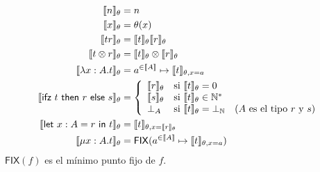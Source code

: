 \documentclass[twoside,a4paper,12pt]{article}
\theoremstyle{definition}
\theoremstyle{remark}
\begin{document}
\begin{align*}
  \semT{n}             &= n \\
  \semT{x}             &= \theta(x) \\
  \semT{tr}            &= \semT{t} \semT{r} \\
  \semT{t\otimes r}    &= \semT{t} \otimes \semT{r} \\
  \semT{\fun{x:A}t}    &= \funSem{a}{A}{\semT[\theta,x=a]{t}} \\
  \semT{\ifz trs}      &=
    \left\{\begin{array}{ll}
      \semT{r} & \textrm{si }\semT{t} = 0 \\
      \semT{s} & \textrm{si }\semT{t} \in \mathbb{N^*} \\
      \bot_{A} & \textrm{si }\semT{t} = \bot_{\mathbb N} \quad \textrm{($A$ es el tipo $r$ y $s$)}
    \end{array}\right. \\
  \semT{\letl{x:A}{r}{t}} &= \semT[\theta,x=\semT{r}]{t} \\
  \semT{\fix{x:A}{t}}     &= \FIX(\funSem{a}{A}{\semT[\theta,x=a]{t}})
\end{align*}
$\mathsf{FIX}(f)$ es el mínimo punto fijo de $f$.
\end{document}
